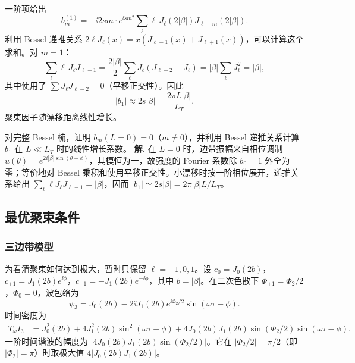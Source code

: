 一阶项给出
\begin{equation}
b_m^{(1)}=-\ii 2sm\cdot e^{\ii sm^2}\sum_\ell\ell\, J_\ell(2|\beta|)J_{\ell-m}(2|\beta|).
\label{eq:feqo-bunching-first-order}
\end{equation}
利用 Bessel 递推关系 $2\ell J_\ell(x)=x(J_{\ell-1}(x)+J_{\ell+1}(x))$，可以计算这个求和。对 $m=1$：
\begin{equation}
\sum_\ell\ell\, J_\ell J_{\ell-1}=\frac{2|\beta|}{2}\sum_\ell J_\ell(J_{\ell-2}+J_\ell)
=|\beta|\sum_\ell J_\ell^2=|\beta|,
\label{eq:feqo-bessel-sum}
\end{equation}
其中使用了 $\sum J_\ell J_{\ell-2}=0$（平移正交性）。因此
\begin{equation}
|b_1|\approx 2s|\beta|=\frac{2\pi L|\beta|}{L_T}.
\label{eq:feqo-bunching-linear}
\end{equation}
聚束因子随漂移距离线性增长。


\par
\begin{workedexample}
对完整 Bessel 梳，证明 $b_m(L=0)=0$（$m\neq0$），并利用 Bessel 递推关系计算 $b_1$ 在 $L\ll L_T$ 时的线性增长系数。
\textbf{解.} 在 $L=0$ 时，边带振幅来自相位调制 $u(\theta)=e^{2i|\beta|\sin(\theta-\phi)}$，其模恒为一，故强度的 Fourier 系数除 $b_0=1$ 外全为零；等价地对 Bessel 乘积和使用平移正交性。小漂移时按一阶相位展开，递推关系给出 $\sum_\ell\ell J_\ell J_{\ell-1}=|\beta|$，因而 $|b_1|\simeq2s|\beta|=2\pi|\beta|L/L_T$。
\end{workedexample}
\par
\subsection{最优聚束条件}

\subsubsection{三边带模型}

为看清聚束如何达到极大，暂时只保留 $\ell=-1,0,1$。设 $c_0=J_0(2b)$，$c_{+1}=J_1(2b)e^{\ii\phi}$，$c_{-1}=-J_1(2b)e^{-\ii\phi}$，其中 $b=|\beta|$。在二次色散下 $\Phi_{\pm1}=\Phi_2/2$，$\Phi_0=0$，波包络为
\begin{equation}
\psi_3=J_0(2b)-2\ii J_1(2b)e^{\ii\Phi_2/2}\sin(\omega\tau-\phi).
\label{eq:feqo-three-sideband-wave}
\end{equation}
时间密度为
\begin{align}
T_\omega I_3&=J_0^2(2b)+4J_1^2(2b)\sin^2(\omega\tau-\phi)
+4J_0(2b)J_1(2b)\sin(\Phi_2/2)\sin(\omega\tau-\phi).
\label{eq:feqo-three-sideband-I}
\end{align}
一阶时间谐波的幅度为 $|4J_0(2b)J_1(2b)\sin(\Phi_2/2)|$。它在 $|\Phi_2/2|=\pi/2$（即 $|\Phi_2|=\pi$）时取极大值 $4|J_0(2b)J_1(2b)|$。


